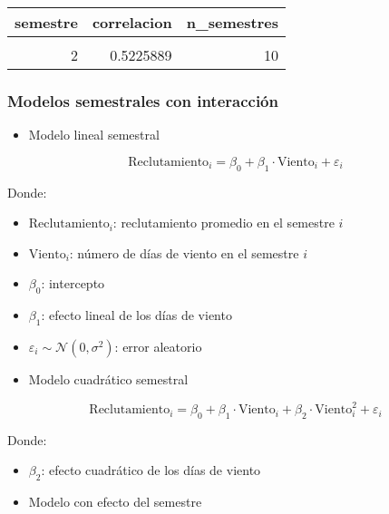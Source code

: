 \documentclass[
]{article}
\providecommand{\tightlist}{%
  \setlength{\itemsep}{0pt}\setlength{\parskip}{0pt}}
\begin{document}
\begin{table}[!h]
\centering
\begin{tabular}[t]{r|r|r}
\hline
semestre & correlacion & n\_semestres\\
\hline
\cellcolor{gray!10}{1} & \cellcolor{gray!10}{-0.1966243} & \cellcolor{gray!10}{10}\\
\hline
2 & 0.5225889 & 10\\
\hline
\end{tabular}
\end{table}

\newpage

\subsubsection{Modelos semestrales con interacción}\label{modelos-semestrales-con-interacciuxf3n}

\begin{itemize}
\tightlist
\item
  Modelo lineal semestral
\end{itemize}

\[
\text{Reclutamiento}_i = \beta_0 + \beta_1 \cdot \text{Viento}_i + \varepsilon_i
\]

Donde:

\begin{itemize}
\item
  \(\text{Reclutamiento}_i\): reclutamiento promedio en el semestre \(i\)
\item
  \(\text{Viento}_i\): número de días de viento en el semestre \(i\)
\item
  \(\beta_0\): intercepto
\item
  \(\beta_1\): efecto lineal de los días de viento
\item
  \(\varepsilon_i \sim \mathcal{N}(0, \sigma^2)\): error aleatorio
\item
  Modelo cuadrático semestral
\end{itemize}

\[
\text{Reclutamiento}_i = \beta_0 + \beta_1 \cdot \text{Viento}_i + \beta_2 \cdot \text{Viento}_i^2 + \varepsilon_i
\]

Donde:

\begin{itemize}
\item
  \(\beta_2\): efecto cuadrático de los días de viento
\item
  Modelo con efecto del semestre
\end{itemize}
\end{document}

